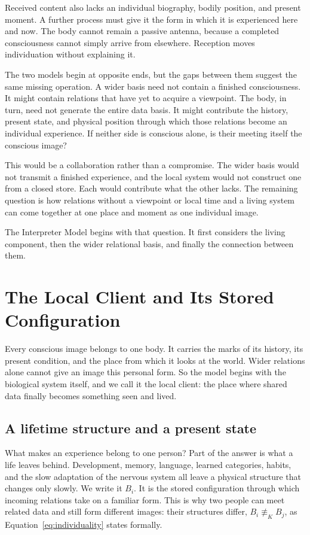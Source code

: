 Received content also lacks an individual biography, bodily position, and present
moment. A further process must give it the form in which it is experienced here and
now. The body cannot remain a passive antenna, because a completed consciousness
cannot simply arrive from elsewhere. Reception moves individuation without explaining
it.

The two models begin at opposite ends, but the gaps between them suggest the same
missing operation. A wider basis need not contain a finished consciousness. It might
contain relations that have yet to acquire a viewpoint. The body, in turn, need not
generate the entire data basis. It might contribute the history, present state, and
physical position through which those relations become an individual experience. If
neither side is conscious alone, is their meeting itself the conscious image?

This would be a collaboration rather than a compromise. The wider basis would not
transmit a finished experience, and the local system would not construct one from a
closed store. Each would contribute what the other lacks. The remaining question is
how relations without a viewpoint or local time and a living system can come together
at one place and moment as one individual image.

The Interpreter Model begins with that question. It first considers the living
component, then the wider relational basis, and finally the connection between them.

\section{The Local Client and Its Stored Configuration}
\label{sec:local_client}

Every conscious image belongs to one body. It carries the marks of its history, its
present condition, and the place from which it looks at the world. Wider relations
alone cannot give an image this personal form. So the model begins with the
biological system itself, and we call it the local client: the place where shared
data finally becomes something seen and lived.

\subsection{A lifetime structure and a present state}

What makes an experience belong to one person? Part of the answer is what a life
leaves behind. Development, memory, language, learned categories, habits, and the
slow adaptation of the nervous system all leave a physical structure that changes
only slowly. We write it $B_i$. It is the stored configuration through which incoming
relations take on a familiar form. This is why two people can meet related data and
still form different images: their structures differ, $B_i\not\equiv_K B_j$, as
Equation~\eqref{eq:individuality} states formally.

